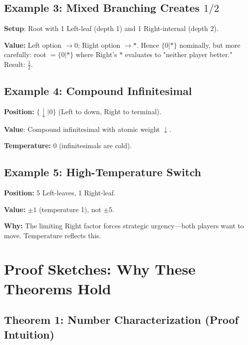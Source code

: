 \documentclass[10pt,a4paper,twocolumn]{article}
\theoremstyle{plain}
\theoremstyle{definition}
\theoremstyle{remark}
\begin{document}
\subsection{Example 3: Mixed Branching Creates $1/2$}

\textbf{Setup}: Root with 1 Left-leaf (depth 1) and 1 Right-internal (depth 2).

\textbf{Value:} Left option $\to 0$; Right option $\to *$. Hence $\{0 | *\}$ nominally, but more carefully: root $= \{0|*\}$ where Right's $*$ evaluates to "neither player better." Result: $\frac{1}{2}$.

\subsection{Example 4: Compound Infinitesimal}

\textbf{Position:} $\{\downarrow | 0\}$ (Left to down, Right to terminal).

\textbf{Value}: Compound infinitesimal with atomic weight $\downarrow$.

\textbf{Temperature:} 0 (infinitesimals are cold).

\subsection{Example 5: High-Temperature Switch}

\textbf{Position:} 5 Left-leaves, 1 Right-leaf.

\textbf{Value:} $\pm 1$ (temperature 1), not $\pm 5$.

\textbf{Why:} The limiting Right factor forces strategic urgency—both players want to move. Temperature reflects this.

\section{Proof Sketches: Why These Theorems Hold}

\subsection{Theorem 1: Number Characterization (Proof Intuition)}
\end{document}
